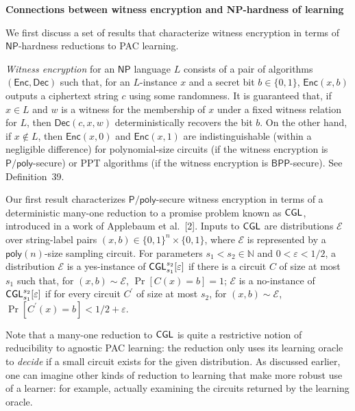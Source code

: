 \documentclass[10pt,a4paper]{article}
\begin{document}
\par\medskip\noindent\textbf{Connections between witness encryption and NP-hardness of learning}\par




We first discuss a set of results that characterize witness encryption in terms of ${\mathsf{NP}}$-hardness reductions to PAC learning.\par




\emph{Witness encryption} for an ${\mathsf{NP}}$ language $L$ consists of a pair of algorithms $({\mathsf{Enc}},{\mathsf{Dec}})$ such that, for an $L$-instance $x$ and a secret bit $b\in\{0,1\}$, ${\mathsf{Enc}}(x,b)$ outputs a ciphertext string $c$ using some randomness. It is guaranteed that, if $x\in L$ and $w$ is a witness for the membership of $x$ under a fixed witness relation for $L$, then ${\mathsf{Dec}}(c,x,w)$ deterministically recovers the bit $b$. On the other hand, if $x\notin L$, then ${\mathsf{Enc}}(x,0)$ and ${\mathsf{Enc}}(x,1)$ are indistinguishable (within a negligible difference) for polynomial-size circuits (if the witness encryption is ${\mathsf{P}}/{\mathsf{poly}}$-secure) or PPT algorithms (if the witness encryption is ${\mathsf{BPP}}$-secure). See Definition 39.\par




Our first result characterizes ${\mathsf{P}}/{\mathsf{poly}}$-secure witness encryption in terms of a deterministic many-one reduction to a promise problem known as ${\sf CGL}$, introduced in a work of Applebaum et al. [2]. Inputs to ${\sf CGL}$ are distributions $\mathcal{E}$ over string-label pairs $(x,b)\in\{0,1\}^{n}\times\{0,1\}$, where $\mathcal{E}$ is represented by a ${\mathsf{poly}}(n)$-size sampling circuit. For parameters $s_{1}<s_{2}\in\mathbb{N}$ and $0<\varepsilon<1/2$, a distribution $\mathcal{E}$ is a yes-instance of ${\sf CGL}_{s_{1}}^{s_{2}}[\varepsilon]$ if there is a circuit $C$ of size at most $s_{1}$ such that, for $(x,b)\sim\mathcal{E}$, $\Pr[C(x)=b]=1$; $\mathcal{E}$ is a no-instance of ${\sf CGL}_{s_{1}}^{s_{2}}[\varepsilon]$ if for every circuit $C^{\prime}$ of size at most $s_{2}$, for $(x,b)\sim\mathcal{E}$, $\Pr[C^{\prime}(x)=b]<1/2+\varepsilon$.\par




Note that a many-one reduction to ${\sf CGL}$ is quite a restrictive notion of reducibility to agnostic PAC learning: the reduction only uses its learning oracle to \emph{decide} if a small circuit exists for the given distribution. As discussed earlier, one can imagine other kinds of reduction to learning that make more robust use of a learner: for example, actually examining the circuits returned by the learning oracle.\par
\end{document}
